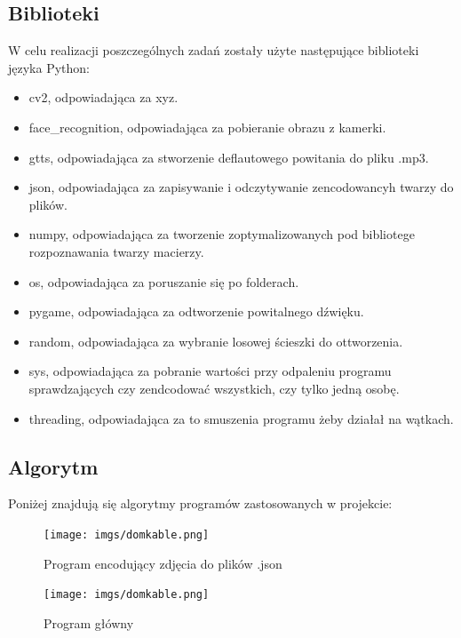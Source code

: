 \documentclass[a4paper,12pt,reqno]{article}
\begin{document}
\subsection{Biblioteki}
W celu realizacji poszczególnych zadań zostały użyte następujące biblioteki języka Python:
\textcolor{new}{
\begin{itemize}
\item cv2, odpowiadająca za \textcolor{to_check_at_end}{xyz}.
\item face\_recognition, odpowiadająca za \textcolor{to_check_at_end}{pobieranie obrazu z kamerki}.
\item gtts, odpowiadająca za \textcolor{to_check_at_end}{stworzenie deflautowego powitania do pliku .mp3}.
\item json, odpowiadająca za zapisywanie i odczytywanie zencodowancyh twarzy do plików.
\item numpy, odpowiadająca za \textcolor{to_check_at_end}{tworzenie zoptymalizowanych pod bibliotege rozpoznawania twarzy macierzy}.
\item os, odpowiadająca za poruszanie się po folderach.
\item pygame, odpowiadająca za \textcolor{to_check_at_end}{odtworzenie powitalnego dźwięku}.
\item random, odpowiadająca za \textcolor{to_check_at_end}{wybranie losowej ścieszki do ottworzenia}.
\item sys, odpowiadająca za \textcolor{to_check_at_end}{pobranie wartości przy odpaleniu programu sprawdzających czy zendcodować wszystkich, czy tylko jedną osobę}.
\item \textcolor{to_check_at_end}{threading, odpowiadająca za to smuszenia programu żeby działał na wątkach}.
\end{itemize}
}
\subsection{Algorytm}
Poniżej znajdują się algorytmy programów zastosowanych w projekcie:

\begin{figure}[!ht]%
\centering
\texttt{[image: imgs/domkable.png]}
\caption{Program encodujący zdjęcia do plików .json \label{algorytm_encode_faces}}
\quad
\end{figure}

\begin{figure}[!ht]%
\centering
\texttt{[image: imgs/domkable.png]}
\caption{Program główny \label{algorytm_start_recognition}}
\quad
\end{figure}
\end{document}
